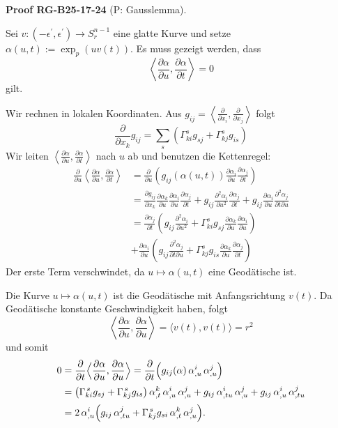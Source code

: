 \documentclass[10pt, letterpaper]{article}
\newcommand{\CustomHeading}[3]{%
  \par\medskip\noindent%
  \textbf{#1 #2} \textnormal{(#3)}.\enskip%
}
\newenvironment{PROOF}[2]{\begin{unitbox}\CustomHeading{Proof}{#1}{#2}}{\end{unitbox}}
\begin{document}
\begin{PROOF}{RG-B25-17-24}{P: Gausslemma}
Sei $v:\left(-\epsilon^{\prime}, \epsilon^{\prime}\right) \rightarrow S_{r}^{n-1}$ eine glatte Kurve und setze $\alpha(u, t):=\exp _{p}(u v(t))$. Es muss gezeigt werden, dass
$$
\left\langle\frac{\partial \alpha}{\partial u}, \frac{\partial \alpha}{\partial t}\right\rangle=0
$$
gilt.

Wir rechnen in lokalen Koordinaten. Aus $g_{i j}=\left\langle\frac{\partial}{\partial x_{i}}, \frac{\partial}{\partial x_{j}}\right\rangle$ folgt
$$
\frac{\partial}{\partial x_{k}} g_{i j}=\sum_{s}\left(\Gamma_{k i}^{s} g_{s j}+\Gamma_{k j}^{s} g_{i s}\right)
$$
Wir leiten $\left\langle\frac{\partial \alpha}{\partial u}, \frac{\partial \alpha}{\partial t}\right\rangle$ nach $u$ ab und benutzen die Kettenregel:
$$
\begin{aligned}
\frac{\partial}{\partial u}\left\langle\frac{\partial \alpha}{\partial u}, \frac{\partial \alpha}{\partial t}\right\rangle & =\frac{\partial}{\partial u}\left(g_{i j}(\alpha(u, t)) \frac{\partial \alpha_{i}}{\partial u} \frac{\partial \alpha_{j}}{\partial t}\right) \\
& =\frac{\partial g_{i j}}{\partial x_{k}} \frac{\partial \alpha_{k}}{\partial u} \frac{\partial \alpha_{i}}{\partial u} \frac{\partial \alpha_{j}}{\partial t}+g_{i j} \frac{\partial^{2} \alpha_{i}}{\partial u^{2}} \frac{\partial \alpha_{j}}{\partial t}+g_{i j} \frac{\partial \alpha_{i}}{\partial u} \frac{\partial^{2} \alpha_{j}}{\partial t \partial u} \\
& =\frac{\partial \alpha_{j}}{\partial t}\left(g_{i j} \frac{\partial^{2} \alpha_{i}}{\partial u^{2}}+\Gamma_{k i}^{s} g_{s j} \frac{\partial \alpha_{k}}{\partial u} \frac{\partial \alpha_{i}}{\partial u}\right) \\
& +\frac{\partial \alpha_{i}}{\partial u}\left(g_{i j} \frac{\partial^{2} \alpha_{j}}{\partial t \partial u}+\Gamma_{k j}^{s} g_{i s} \frac{\partial \alpha_{k}}{\partial u} \frac{\partial \alpha_{j}}{\partial t}\right)
\end{aligned}
$$
Der erste Term verschwindet, da $u \mapsto \alpha(u, t)$ eine Geodätische ist.

Die Kurve $u \mapsto \alpha(u, t)$ ist die Geodätische mit Anfangsrichtung $v(t)$. Da Geodätische konstante Geschwindigkeit haben, folgt
$$
\left\langle\frac{\partial \alpha}{\partial u}, \frac{\partial \alpha}{\partial u}\right\rangle=\langle v(t), v(t)\rangle=r^{2}
$$
und somit
\[
\begin{aligned}
0
&=\frac{\partial}{\partial t}
     \Bigl\langle\frac{\partial\alpha}{\partial u},
                 \frac{\partial\alpha}{\partial u}\Bigr\rangle
   =\frac{\partial}{\partial t}
     \Bigl(g_{ij}(\alpha)\,\alpha_{,u}^i\,\alpha_{,u}^j\Bigr)\\[2pt]
&=\bigl(\Gamma_{ki}^{\,s}g_{sj}+\Gamma_{kj}^{\,s}g_{is}\bigr)\,
      \alpha_{,t}^k\,\alpha_{,u}^i\,\alpha_{,u}^j
   +g_{ij}\,\alpha_{,tu}^i\,\alpha_{,u}^j
   +g_{ij}\,\alpha_{,u}^i\,\alpha_{,tu}^j\\[2pt]
&=2\,\alpha_{,u}^i\Bigl(
      g_{ij}\,\alpha_{,tu}^j
      +\Gamma_{kj}^{\,s}g_{si}\,
         \alpha_{,t}^k\,\alpha_{,u}^j\Bigr).
\end{aligned}
\]


\end{PROOF}
\end{document}
